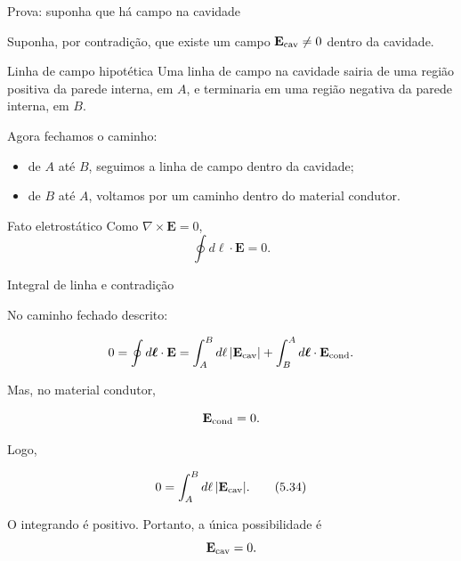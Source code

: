 \documentclass[aspectratio=169]{beamer}
\begin{document}
\begin{frame}{Prova: suponha que há campo na cavidade}

\small

Suponha, por contradição, que existe um campo
\(\mathbf E_{\rm cav}\neq 0\) dentro da cavidade.

\begin{mybox}{Linha de campo hipotética}
Uma linha de campo na cavidade sairia de uma região positiva da parede interna,
em \(A\), e terminaria em uma região negativa da parede interna, em \(B\).
\end{mybox}

Agora fechamos o caminho:

\begin{itemize}
\item de \(A\) até \(B\), seguimos a linha de campo dentro da cavidade;
\item de \(B\) até \(A\), voltamos por um caminho dentro do material condutor.
\end{itemize}

\begin{alertblock}{Fato eletrostático}
Como \(\nabla\times\mathbf E=0\),
\[
\oint d\boldsymbol{\ell}\cdot \mathbf E=0.
\]
\end{alertblock}

\end{frame}

\begin{frame}{Integral de linha e contradição}

\footnotesize

No caminho fechado descrito:

\begin{eqbox}
\begin{equation}
0
=
\oint d\boldsymbol{\ell}\cdot\mathbf E
=
\int_A^B d\ell\,|\mathbf E_{\rm cav}|
+
\int_B^A d\boldsymbol{\ell}\cdot\mathbf E_{\rm cond}.
\label{eq:linha-fechada-blindagem}
\end{equation}
\end{eqbox}

Mas, no material condutor,

\[
\mathbf E_{\rm cond}=0.
\]

Logo,

\begin{eqbox}
\begin{equation}
0
=
\int_A^B d\ell\,|\mathbf E_{\rm cav}|.
\tag{5.34}
\label{eq:prova-cavidade-campo-zero}
\end{equation}
\end{eqbox}

O integrando é positivo. Portanto, a única possibilidade é
\[
\mathbf E_{\rm cav}=0.
\]

\end{frame}
\end{document}
